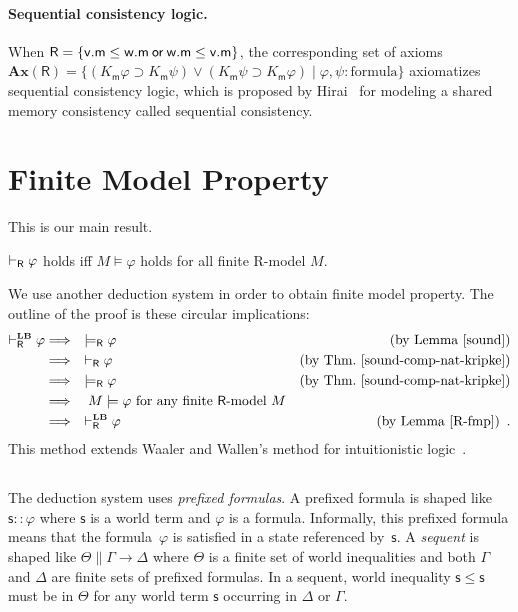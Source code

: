 \paragraph{Sequential consistency logic.}
When $\mathsf R=\{\mathsf v.\mathsf m\le\mathsf w.\mathsf m\mathbin{\mathsf{or}} \mathsf
w.\mathsf m\le \mathsf v.\mathsf m\}$,
the corresponding set of axioms
$\mathbf{Ax}(\mathsf R) = \{(K_{\mathsf m}\varphi\supset K_{\mathsf
m}\psi)\vee(K_{\mathsf m}\psi\supset K_{\mathsf m}\varphi)\mid \varphi,
\psi\colon\mbox{formula}\}$
 axiomatizes sequential consistency logic,
which is proposed by Hirai~\cite{hirailpar} for modeling a shared memory consistency called sequential consistency.


\section{Finite Model Property}
\label{fmp-proof}

This is our main result.
\begin{theorem}
 \label{thm:fmp}
 $\vdash_{\mathsf R}\varphi$ holds iff $M\models \varphi$ holds
 for all finite {\sf R}-model $M$.
\end{theorem}

We use another deduction system\,\LB\,in order to obtain finite model
property.
The outline of the proof is these circular implications:
\begin{align*}
 \vdashRLB\varphi &\Longrightarrow \quad \models_{\mathsf R}\varphi\quad
 &(\mbox{by Lemma~\ref{sound}})\\
 &\Longrightarrow \quad \vdash_{\mathsf R}\varphi &(\mbox{by
 Thm.~\ref{sound-comp-nat-kripke}}) \\
 &\Longrightarrow\quad \modelsR\varphi &\mbox{(by Thm.~\ref{sound-comp-nat-kripke})}\\
 &\Longrightarrow\quad M\models\varphi \mbox{ for any finite $\mathsf
 R$-model }M\\
 &\Longrightarrow\quad \vdashRLB\varphi & (\mbox{by
 Lemma~\ref{R-fmp}})\enspace .
\end{align*}
This method extends Waaler
and Wallen's method for intuitionistic logic~\cite{waaler1999tableaux}.

\subsection{\LB}

The deduction system\,\LB\,uses \textit{prefixed formulas}.  A
prefixed formula is shaped like $\mathsf s::\varphi$ where $\mathsf s $
is a world term and $\varphi$ is a formula.
Informally, this prefixed formula means that the formula~$\varphi$ is
satisfied in a state referenced by~$\mathsf s$.
A \textit{sequent} is shaped like
  $\Theta\parallel \Gamma\longrightarrow \Delta$ where
$\Theta$ is a finite set of world inequalities and both
$\Gamma$ and $\Delta$ are finite sets of prefixed formulas.
In a sequent, world inequality
$\mathsf s\le \mathsf s$ must be in $\Theta$
 for any world term $\mathsf s$ occurring in $\Delta$ or $\Gamma$.

